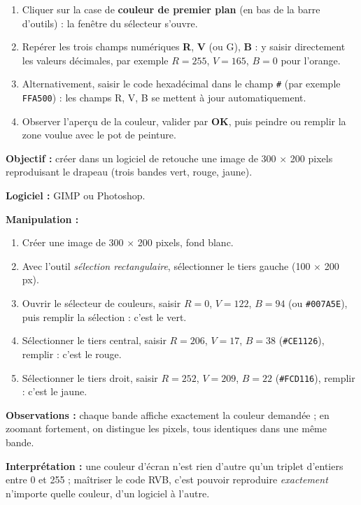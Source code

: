 \documentclass[11pt]{article}
\begin{document}
\begin{methode}
\begin{enumerate}
  \item Cliquer sur la case de \textbf{couleur de premier plan} (en bas de la barre d'outils) : la fenêtre du sélecteur s'ouvre.
  \item Repérer les trois champs numériques \textbf{R}, \textbf{V} (ou G), \textbf{B} : y saisir directement les valeurs décimales, par exemple $R=255$, $V=165$, $B=0$ pour l'orange.
  \item Alternativement, saisir le code hexadécimal dans le champ \texttt{\#} (par exemple \texttt{FFA500}) : les champs R, V, B se mettent à jour automatiquement.
  \item Observer l'aperçu de la couleur, valider par \textbf{OK}, puis peindre ou remplir la zone voulue avec le pot de peinture.
\end{enumerate}
\end{methode}

\begin{experience}
\textbf{Objectif :} créer dans un logiciel de retouche une image de 300 $\times$ 200 pixels reproduisant le drapeau (trois bandes vert, rouge, jaune).

\textbf{Logiciel :} GIMP ou Photoshop.

\textbf{Manipulation :}
\begin{enumerate}
  \item Créer une image de 300 $\times$ 200 pixels, fond blanc.
  \item Avec l'outil \emph{sélection rectangulaire}, sélectionner le tiers gauche (100 $\times$ 200 px).
  \item Ouvrir le sélecteur de couleurs, saisir $R=0$, $V=122$, $B=94$ (ou \texttt{\#007A5E}), puis remplir la sélection : c'est le vert.
  \item Sélectionner le tiers central, saisir $R=206$, $V=17$, $B=38$ (\texttt{\#CE1126}), remplir : c'est le rouge.
  \item Sélectionner le tiers droit, saisir $R=252$, $V=209$, $B=22$ (\texttt{\#FCD116}), remplir : c'est le jaune.
\end{enumerate}

\textbf{Observations :} chaque bande affiche exactement la couleur demandée ; en zoomant fortement, on distingue les pixels, tous identiques dans une même bande.

\textbf{Interprétation :} une couleur d'écran n'est rien d'autre qu'un triplet d'entiers entre 0 et 255 ; maîtriser le code RVB, c'est pouvoir reproduire \emph{exactement} n'importe quelle couleur, d'un logiciel à l'autre.
\end{experience}
\end{document}
